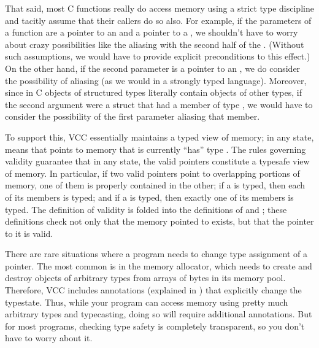 That said, most C functions really do access memory using a strict type
discipline and tacitly assume that their callers do
so also. For example, if the parameters of a function are a pointer to
an  and a pointer to a , we shouldn't have to worry
about crazy possibilities like the  aliasing with the second
half of the . (Without such assumptions, we would have to
provide explicit preconditions to this effect.)  On the other hand, if
the second parameter is a pointer to an , we do consider the
possibility of aliasing (as we would in a strongly typed language).
Moreover, since in C objects of structured types literally contain
objects of other types, if the second argument were a struct that had
a member of type , we would have to consider the possibility
of the first parameter aliasing that member. 

To support this, VCC essentially maintains a typed view of memory; in
any state,  means that  points to memory that is
currently ``has'' type . The rules governing validity guarantee
that in any state, the valid pointers constitute a typesafe view of
memory.  In particular, if two valid pointers point to overlapping
portions of memory, one of them is properly contained in the other; if
a  is typed, then each of its members is typed; and if a
 is typed, then exactly one of its members is typed.  The
definition of validity is folded into the definitions of
 and \vcc{\unwrapped}; these definitions check not
only that the memory pointed to exists, but that the pointer to it is
valid.

There are rare situations where a program needs to change type
assignment of a pointer.  The most common is in the memory allocator,
which needs to create and destroy objects of arbitrary types from
arrays of bytes in its memory pool. Therefore, VCC includes
annotations (explained in ) that explicitly change the
typestate.  Thus, while your program can access memory using pretty
much arbitrary types and typecasting, doing so will require additional
annotations. But for most programs, checking type safety is completely
transparent, so you don't have to worry about it.

